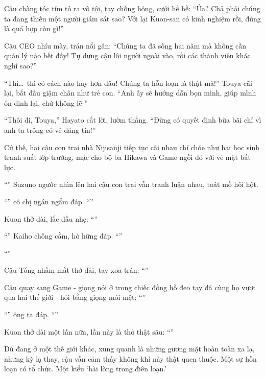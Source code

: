 \documentclass[../main.tex]{subfiles}
\begin{document}
Cậu chàng tóc tím tỏ ra vô tội, tay chống hông, cười hề hề: ``Ủa? Chả phải chúng ta đang thiếu một người giám sát sao? Với lại Kuon-san có kinh nghiệm rồi, đúng là quá hợp còn gì!''

Cậu CEO nhíu mày, trán nổi gân: ``Chúng ta đã sống hai năm mà không cần quản lý nào hết đấy! Tự dưng cậu lôi người ngoài vào, rồi các thành viên khác nghĩ sao?''

``Thì\dots\ thì có cách nào hay hơn đâu! Chúng ta hỗn loạn là thật mà!'' Touya cãi lại, bắt đầu giậm chân như trẻ con. ``Anh ấy sẽ hướng dẫn bọn mình, giúp mình ổn định lại, chứ không lẽ-''

``Thôi đi, Touya,'' Hayato cắt lời, lườm thẳng. ``Đừng có quyết định bừa bãi chỉ vì anh ta trông có vẻ đáng tin!''

Cứ thế, hai cậu con trai nhà Nijisanji tiếp tục cãi nhau chí chóe như hai học sinh tranh suất lớp trưởng, mặc cho bộ ba Hikawa và Game ngồi đó với vẻ mặt bất lực.

``'' Suzuno ngước nhìn lên hai cậu con trai vẫn tranh luận nhau, toát mồ hôi hột.

``'' cô chị ngán ngẩm đáp. ``''

Kuon thở dài, lắc đầu nhẹ: ``''

``'' Kaiho chống cằm, hờ hững đáp. ``''

``''

Cậu Tổng nhắm mắt thở dài, tay xoa trán: ``''

Cậu quay sang Game - giọng nói ở trong chiếc đồng hồ đeo tay đã cùng họ vượt qua hai thế giới - hỏi bằng giọng mỏi mệt: ``''

``'' ông ta đáp. ``''

Kuon thở dài một lần nữa, lần này là thở thật sâu: ``''

Dù đang ở một thế giới khác, xung quanh là những gương mặt hoàn toàn xa lạ, nhưng kỳ lạ thay, cậu vẫn cảm thấy không khí này thật quen thuộc. Một sự hỗn loạn có tổ chức. Một kiểu `hài lòng trong điên loạn.'
\end{document}

